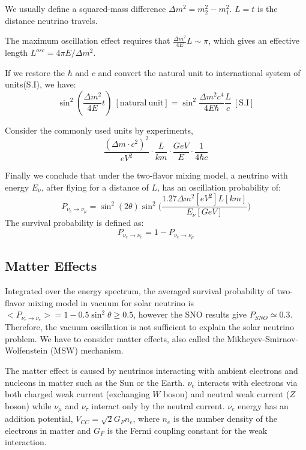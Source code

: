 \documentclass[preprint,12pt]{elsarticle}
\numberwithin{equation}{section}
\begin{document}
We usually define a  squared-mass difference $\Delta m^2=m_2^2-m_1^2$. $L = t$ is the distance neutrino travels. 

The maximum oscillation effect requires that $\frac{\Delta m^2}{4E}L\sim \pi$, which gives an effective length $L^{osc}=4\pi E/\Delta m^2$.

If we restore the $\hbar$ and $c$ and convert the natural unit to international system of units(S.I), we have:
\[
\sin^2(\frac{\Delta m^2}{4E}t)~\mathrm{[natural~unit]} = \sin^2\frac{\Delta m^2c^4}{4E\hbar}\frac{L}{c}~\mathrm{[S.I]}
\]

Consider the commonly used units by experiments,
\[
\frac{(\Delta m\cdot c^2)^2}{eV^2}\cdot \frac{L}{km}\cdot\frac{GeV}{E}\cdot\frac{1}{4\hbar c}
\]

Finally we conclude that under the two-flavor mixing model, a neutrino with energy $E_\nu$, after flying for a distance of $L$, has an oscillation probability of: 
\begin{equation}
P_{\nu_e\to\nu_{\mu}}=\sin^2(2\theta)\sin^2\Big(\frac{1.27\Delta m^2[eV^2]L[km]}{E_\nu[GeV]}\Big)
\end{equation}
The survival probability is defined as:
\begin{equation}
P_{\nu_e\to\nu_e}=1-P_{\nu_e\to\nu_{\mu}}
\end{equation}

\subsection{Matter Effects}
Integrated over the energy spectrum, the averaged survival probability of two-flavor mixing model in vacuum for solar neutrino is $<P_{\nu_e\to\nu_e}> = 1- 0.5\sin^2\theta\geq 0.5$, however the SNO results give $P_{SNO}\simeq0.3$. Therefore, the vacuum oscillation is not sufficient to explain the solar neutrino problem. We have to consider matter effects, also called the Mikheyev-Smirnov-Wolfenstein (MSW) mechanism\cite{smirnov,smirnov_msw}. 

The matter effect is caused by neutrinos interacting with ambient electrons and nucleons in matter such as the Sun or the Earth. $\nu_e$ interacts with electrons via both charged weak current (exchanging $W$ boson) and neutral weak current ($Z$ boson) while $\nu_\mu$ and $\nu_\tau$ interact only by the neutral current. $\nu_e$ energy has an addition potential, $V_{CC} =\sqrt2G_Fn_e$, where $n_e$ is the number density of the electrons in matter and $G_F$ is the Fermi coupling constant for the weak interaction\cite{smirnov,smirnov_msw}.
\end{document}

